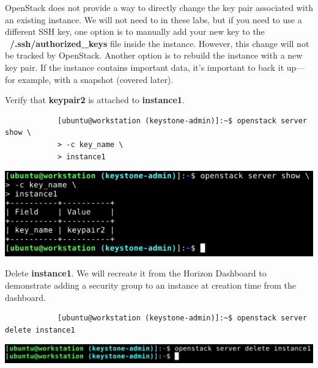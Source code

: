 \documentclass[letterpaper, 12pt]{article}
\begin{document}
\begin{enumerate}
    \begin{tipbox}
        OpenStack does not provide a way to directly change the key pair associated with an existing instance.
        We will not need to in these labs, but if you need to use a different SSH key, one option is to manually add your new key to the \textbf{~/.ssh/authorized\_keys} file inside the instance.
        However, this change will not be tracked by OpenStack.
        Another option is to rebuild the instance with a new key pair.
        If the instance contains important data, it's important to back it up---for example, with a snapshot (covered later).
    \end{tipbox}

    \begin{labstep}
        Verify that \textbf{keypair2} is attached to \textbf{instance1}.
        \begin{lstlisting}
            [ubuntu@workstation (keystone-admin)]:~$ openstack server show \
            > -c key_name \
            > instance1
        \end{lstlisting}

        \begin{center}
            \includegraphics[width=\linewidth]{images/part4/step3.png}
        \end{center}
    \end{labstep}

    \begin{labstep}
        Delete \textbf{instance1}.
        We will recreate it from the Horizon Dashboard to demonstrate adding a security group to an instance at creation time from the dashboard.
        \begin{lstlisting}
            [ubuntu@workstation (keystone-admin)]:~$ openstack server delete instance1
        \end{lstlisting}

        \begin{center}
            \includegraphics[width=\linewidth]{images/part4/step4.png}
        \end{center}
    \end{labstep}


\end{enumerate}
\end{document}
